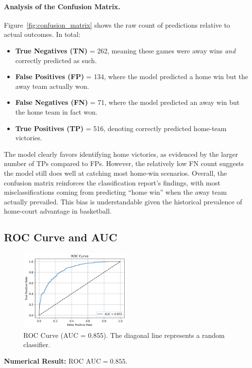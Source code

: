 \documentclass[12pt]{article}
\begin{document}
\paragraph{Analysis of the Confusion Matrix.}
Figure~\ref{fig:confusion_matrix} shows the raw count of predictions relative to actual outcomes. In total:
\begin{itemize}
    \item \textbf{True Negatives (TN)} = 262, meaning these games were away wins \emph{and} correctly predicted as such.
    \item \textbf{False Positives (FP)} = 134, where the model predicted a home win but the away team actually won.
    \item \textbf{False Negatives (FN)} = 71, where the model predicted an away win but the home team in fact won.
    \item \textbf{True Positives (TP)} = 516, denoting correctly predicted home-team victories.
\end{itemize}
The model clearly favors identifying home victories, as evidenced by the larger number of TPs compared to FPs. However, the relatively low FN count suggests the model still does well at catching most home-win scenarios. Overall, the confusion matrix reinforces the classification report’s findings, with most misclassifications coming from predicting \enquote{home win} when the away team actually prevailed. This bias is understandable given the historical prevalence of home-court advantage in basketball.

\subsection{ROC Curve and AUC}
\begin{figure}[H]
\centering
\includegraphics[width=0.5\textwidth]{graph_roc_curve.png}
\caption{ROC Curve (AUC = 0.855). The diagonal line represents a random classifier.}
\label{fig:roc_curve}
\end{figure}

\noindent
\textbf{Numerical Result:} \(\text{ROC AUC} = 0.855.\)
\end{document}
